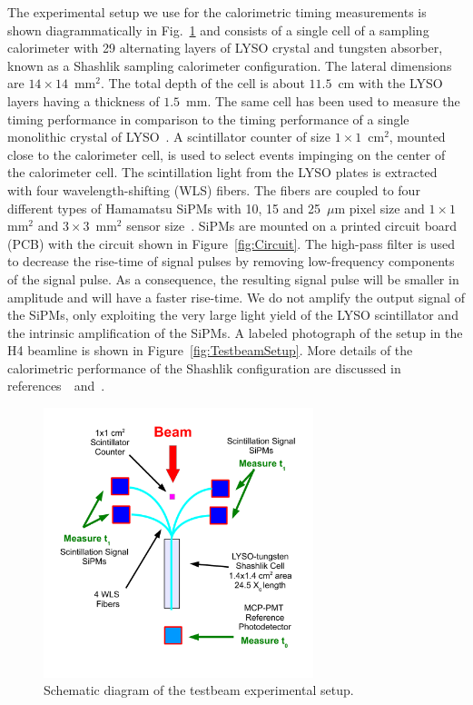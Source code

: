 The experimental setup we use for the calorimetric timing measurements 
is shown diagrammatically in Fig.~\ref{fig:TestbeamSchematic} and consists
of a single cell of a sampling calorimeter with 29 alternating layers of LYSO
crystal and tungsten absorber, known as a Shashlik sampling
calorimeter configuration. The lateral dimensions are
$14\times14$~$\mathrm{mm}^{2}$. The total depth of the cell is about $11.5$~cm
with the LYSO layers having a thickness of $1.5$~mm. The same cell has been used
to measure the timing performance in comparison to the timing performance of a
single monolithic crystal of LYSO~\cite{Anderson:2015gha}. A scintillator
counter of size $1\times 1$~$\mathrm{cm}^{2}$, mounted close to the calorimeter
cell, is used to select events impinging on the center of the calorimeter cell. The
scintillation light from the LYSO plates is extracted with four
wavelength-shifting (WLS) fibers. The fibers are coupled to four different types
of Hamamatsu SiPMs with 10, 15 and 25~$\mu$m pixel size and $1\times
1$~$\mathrm{mm}^{2}$ and $3\times 3$~$\mathrm{mm}^{2}$ sensor
size~\cite{hamamatsuMPPC}. SiPMs are mounted on a printed circuit board (PCB) with the 
circuit shown in Figure~\ref{fig:Circuit}. The high-pass filter is used to decrease the rise-time of signal 
pulses by removing low-frequency components of the signal pulse. As a consequence, the resulting 
signal pulse will be smaller in amplitude and will have a faster rise-time.
We do not amplify the output signal of the SiPMs, only exploiting the very large
light yield of the LYSO scintillator and the intrinsic amplification of the
SiPMs. A labeled photograph of the setup in the H4 beamline is shown in
Figure~\ref{fig:TestbeamSetup}. More details of the calorimetric
performance of the Shashlik configuration are discussed in
references~\cite{shashlik1}~and~\cite{shashlik2}.

\begin{figure}[htbp] 
\centering
\includegraphics[width=0.70\textwidth]{figures/ShashlikFiberSetupSchematic} 
\caption{Schematic diagram of the testbeam experimental setup.} 
\label{fig:TestbeamSchematic} 
\end{figure} 

